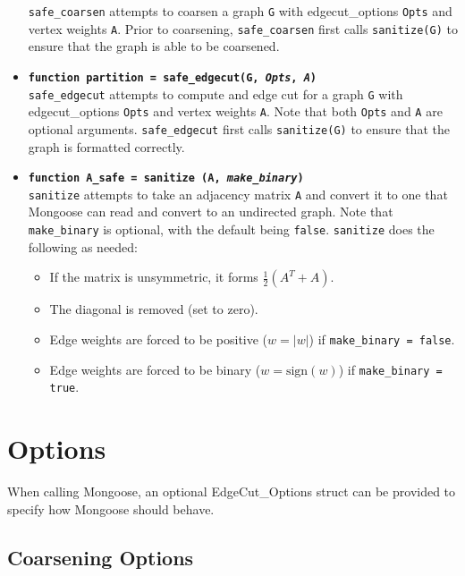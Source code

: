\documentclass[letter]{article}
\begin{document}
\begin{itemize}
\texttt{safe\_coarsen} attempts to coarsen a graph \texttt{G} with edgecut\_options \texttt{Opts} and vertex weights \texttt{A}. Prior to coarsening, \texttt{safe\_coarsen} first calls \texttt{sanitize(G)} to ensure that the graph is able to be coarsened.
\\
\item \textbf{\texttt{function partition = safe\_edgecut(G, \textit{Opts}, \textit{A})}}\\
\texttt{safe\_edgecut} attempts to compute and edge cut for a graph \texttt{G} with edgecut\_options \texttt{Opts} and vertex weights \texttt{A}. Note that both \texttt{Opts} and \texttt{A} are optional arguments. \texttt{safe\_edgecut} first calls \texttt{sanitize(G)} to ensure that the graph is formatted correctly.
\\ 
\item \textbf{\texttt{function A\_safe = sanitize (A, \textit{make\_binary})}}\\
\texttt{sanitize} attempts to take an adjacency matrix \texttt{A} and convert it to one that Mongoose can read and convert to an undirected graph. Note that \texttt{make\_binary} is optional, with the default being \texttt{false}. \texttt{sanitize} does the following as needed:

\begin{itemize}
\item If the matrix is unsymmetric, it forms $\frac{1}{2}(A^T + A)$.
\item The diagonal is removed (set to zero).
\item Edge weights are forced to be positive ($w = |w|$) if \texttt{make\_binary = false}.
\item Edge weights are forced to be binary ($w = \text{sign}(w)$) if \texttt{make\_binary = true}.
\end{itemize}

\end{itemize}

\section{Options}
\label{sec:options}

When calling Mongoose, an optional EdgeCut\_Options struct can be provided to specify how Mongoose should behave.

\subsection{Coarsening Options}
\end{document}
